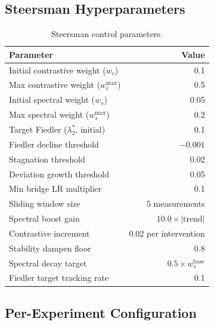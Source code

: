 \documentclass[11pt]{article}
\begin{document}
\subsection{Steersman Hyperparameters}

\begin{table}[H]
\centering
\caption{Steersman control parameters.}
\label{tab:steersman}
\begin{tabular}{lr}
\toprule
Parameter & Value \\
\midrule
Initial contrastive weight ($w_c$) & 0.1 \\
Max contrastive weight ($w_c^{\max}$) & 0.5 \\
Initial spectral weight ($w_s$) & 0.05 \\
Max spectral weight ($w_s^{\max}$) & 0.2 \\
Target Fiedler ($\lambda_2^*$, initial) & 0.1 \\
Fiedler decline threshold & $-0.001$ \\
Stagnation threshold & 0.02 \\
Deviation growth threshold & 0.05 \\
Min bridge LR multiplier & 0.1 \\
Sliding window size & 5 measurements \\
Spectral boost gain & $10.0 \times |\text{trend}|$ \\
Contrastive increment & 0.02 per intervention \\
Stability dampen floor & 0.8 \\
Spectral decay target & $0.5 \times w_s^{\text{base}}$ \\
Fiedler target tracking rate & 0.1 \\
\bottomrule
\end{tabular}
\end{table}

\subsection{Per-Experiment Configuration}
\end{document}
